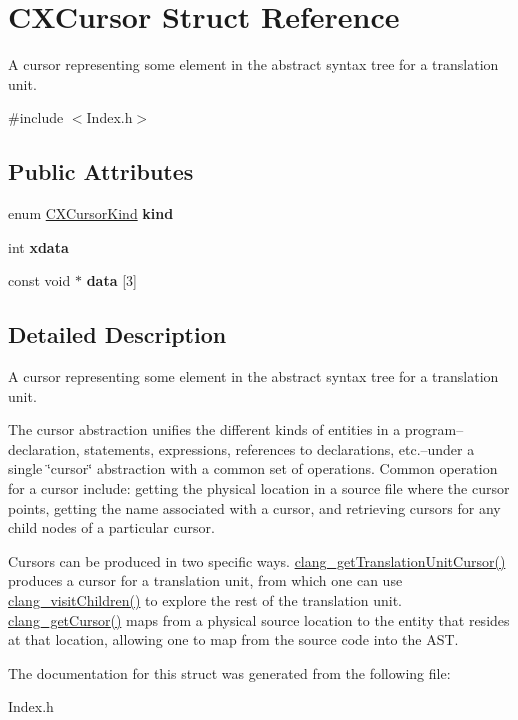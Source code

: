 \hypertarget{structCXCursor}{}\section{C\+X\+Cursor Struct Reference}
\label{structCXCursor}


A cursor representing some element in the abstract syntax tree for a translation unit.  




{\ttfamily \#include $<$Index.\+h$>$}

\subsection*{Public Attributes}
\begin{DoxyCompactItemize}
\item 
\mbox{\label{structCXCursor_af888eaf0e8a90bd6c72c0f40a6a54230}} 
enum \hyperlink{group__CINDEX_gaaccc432245b4cd9f2d470913f9ef0013}{C\+X\+Cursor\+Kind} {\bfseries kind}
\item 
\mbox{\label{structCXCursor_a6d8d6834224ca47d8e64a12696fe904d}} 
int {\bfseries xdata}
\item 
\mbox{\label{structCXCursor_a31e495c1b7ed42d2c093e6d9a09c59a3}} 
const void $\ast$ {\bfseries data} \mbox{[}3\mbox{]}
\end{DoxyCompactItemize}


\subsection{Detailed Description}
A cursor representing some element in the abstract syntax tree for a translation unit. 

The cursor abstraction unifies the different kinds of entities in a program--declaration, statements, expressions, references to declarations, etc.--under a single \char`\"{}cursor\char`\"{} abstraction with a common set of operations. Common operation for a cursor include\+: getting the physical location in a source file where the cursor points, getting the name associated with a cursor, and retrieving cursors for any child nodes of a particular cursor.

Cursors can be produced in two specific ways. \hyperlink{group__CINDEX__CURSOR__MANIP_gaec6e69127920785e74e4a517423f4391}{clang\+\_\+get\+Translation\+Unit\+Cursor()} produces a cursor for a translation unit, from which one can use \hyperlink{group__CINDEX__CURSOR__TRAVERSAL_ga5d0a813d937e1a7dcc35f206ad1f7a91}{clang\+\_\+visit\+Children()} to explore the rest of the translation unit. \hyperlink{group__CINDEX__CURSOR__SOURCE_ga30a9972c7e099ab2735fa6c45e247ec8}{clang\+\_\+get\+Cursor()} maps from a physical source location to the entity that resides at that location, allowing one to map from the source code into the A\+ST. 

The documentation for this struct was generated from the following file\+:\begin{DoxyCompactItemize}
\item 
Index.\+h\end{DoxyCompactItemize}
